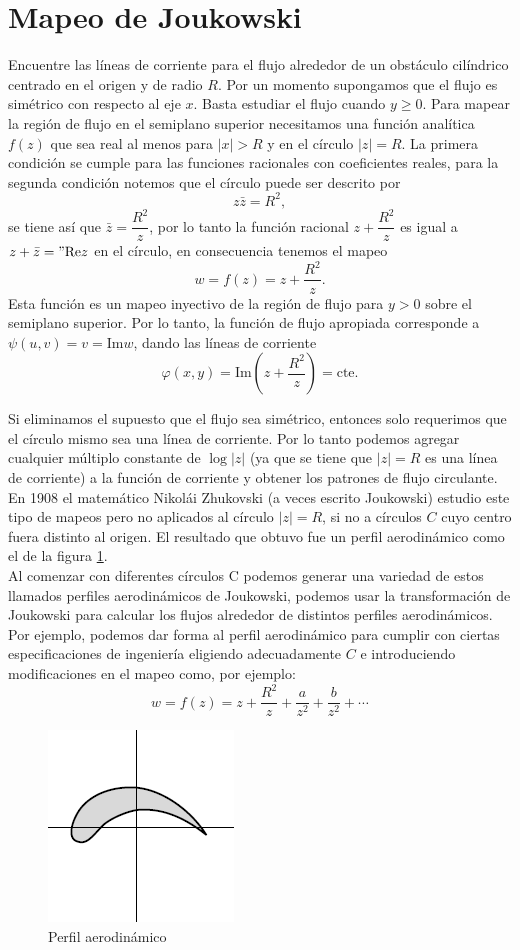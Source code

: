 \section{Mapeo de Joukowski} \label{Joukowski}


\begin{Ejem}
	Encuentre las líneas de corriente para el flujo alrededor de un obstáculo cilíndrico centrado en el origen y de radio $R$.
	\solu
	Por un momento supongamos que el flujo es simétrico con respecto al eje $x$. Basta estudiar el flujo cuando $y\geq 0$. Para mapear la región de flujo en el semiplano superior necesitamos una función analítica $f(z)$ que sea real al menos para $|x|>R$ y en el círculo $|z|=R$. La primera condición se cumple para las funciones racionales con coeficientes reales, para la segunda condición notemos que el círculo puede ser descrito por
	$$z\bar{z}=R^2,$$
	se tiene así que $\bar{z}=\dfrac{R^2}{z}$, por lo tanto la función racional $z+\dfrac{R^2}{z}$ es igual a $z+\bar{z}="\mbox{Re}z$  en el círculo, en consecuencia tenemos el mapeo
	$$w=f(z)=z+\dfrac{R^2}{z}.$$
	Esta función es un mapeo inyectivo de la región de flujo para $y>0$ sobre el semiplano superior. Por lo tanto, la función de flujo apropiada corresponde a $\psi(u, v) = v = \mbox{Im}w$, dando las líneas de corriente
	$$\varphi(x,y)=\mbox{Im}\left(z+\dfrac{R^2}{z}\right)=\mbox{cte}.$$\endsolu
	
\end{Ejem}



Si eliminamos el supuesto que el flujo sea simétrico, entonces solo requerimos que el círculo mismo sea una línea de corriente. Por lo tanto podemos agregar cualquier múltiplo constante  de $\log |z|$ (ya que se tiene que $|z|=R$ es una línea de corriente) a la función de corriente y obtener los patrones de flujo circulante.\\

En 1908 el matemático Nikolái Zhukovski  (a veces escrito Joukowski) estudio este tipo de mapeos pero no aplicados al círculo $|z|=R$, si no a círculos $C$ cuyo centro fuera distinto al origen. El resultado que obtuvo fue un perfil aerodinámico como el de la figura \ref{fig:24}.\\Al comenzar con diferentes círculos C podemos generar una variedad de estos llamados perfiles aerodinámicos de Joukowski, podemos usar la transformación de Joukowski para calcular los flujos alrededor de distintos perfiles aerodinámicos. Por ejemplo, podemos dar forma al perfil aerodinámico para cumplir con ciertas especificaciones de ingeniería eligiendo adecuadamente $C$ e introduciendo modificaciones en el mapeo como, por ejemplo:
$$w=f(z)=z+\dfrac{R^2}{z}+\dfrac{a}{z^2}+\dfrac{b}{z^2}+\cdots$$
\begin{figure}[h!]
	\centering
	\includegraphics[width=0.2\linewidth]{img/24}
	\caption{Perfil aerodinámico}
	\label{fig:24}
\end{figure}
 

